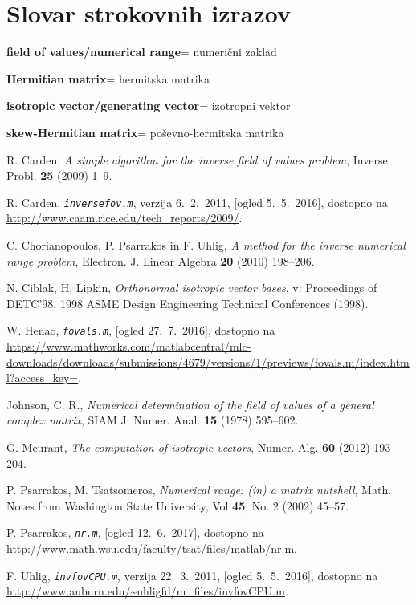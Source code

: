 \documentclass[12pt,a4paper]{amsart}
\theoremstyle{definition}
\theoremstyle{plain}
\newcommand{\geslo}[2]{\noindent\textbf{#1}\hspace*{3mm}\hangindent=\parindent\hangafter=1 #2}
\begin{document}
\newpage




\vfill

\section*{Slovar strokovnih izrazov}

\geslo{field of values/numerical range}{numerični zaklad}

\geslo{Hermitian matrix}{hermitska matrika}

\geslo{isotropic vector/generating vector}{izotropni vektor}

\geslo{skew-Hermitian matrix}{poševno-hermitska matrika}







\begin{thebibliography}{99}



R. Carden, \emph{A simple algorithm for the inverse field of values problem}, Inverse Probl. {\bf 25} (2009) 1--9.

R. Carden, \emph{\texttt{inversefov.m}}, verzija 6.~2.~2011, [ogled 5.~5.~2016], dostopno na \url{http://www.caam.rice.edu/tech_reports/2009/}.

C. Chorianopoulos, P. Psarrakos in F. Uhlig, \emph{A method for the inverse numerical range problem}, Electron. J. Linear Algebra {\bf 20} (2010) 198--206.

N. Ciblak, H. Lipkin, \emph{Orthonormal isotropic vector bases}, v: Proceedings of DETC'98, 1998 ASME Design Engineering Technical Conferences (1998).

W. Henao, \emph{\texttt{fovals.m}}, [ogled 27.~7.~2016], dostopno na \url{https://www.mathworks.com/matlabcentral/mlc-downloads/downloads/submissions/4679/versions/1/previews/fovals.m/index.html?access_key=}.

Johnson, C. R., \emph{Numerical determination of the field of values of a general complex matrix}, SIAM J. Numer. Anal. {\bf 15} (1978) 595--602.

G. Meurant, \emph{The computation of isotropic vectors}, Numer. Alg. {\bf 60} (2012) 193--204.

P. Psarrakos, M. Tsatsomeros, \emph{Numerical range: (in) a matrix nutshell}, Math. Notes from Washington State University,  Vol {\bf 45}, No. 2 (2002) 45--57.

P. Psarrakos, \emph{\texttt{nr.m}}, [ogled 12.~6.~2017], dostopno na \url{http://www.math.wsu.edu/faculty/tsat/files/matlab/nr.m}.

F. Uhlig, \emph{\texttt{invfovCPU.m}}, verzija 22.~3.~2011, [ogled 5.~5.~2016], dostopno na \url{http://www.auburn.edu/~uhligfd/m_files/invfovCPU.m}.

\end{thebibliography}
\end{document}
